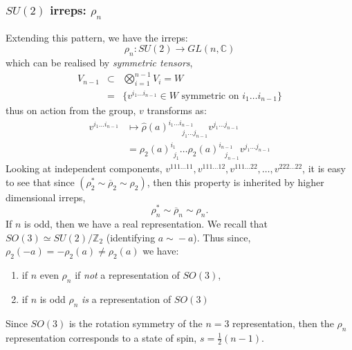 \begin{enumerate}
\subsubsection{$SU(2)$ irreps: $\rho_n$ }
Extending this pattern, we have the irreps: 
\begin{equation}
    \rho_n: SU(2)\rightarrow GL(n, \mathbb{C})
\end{equation}
which can be realised by \textit{symmetric tensors}, 
\begin{eqnarray}
    V_{n-1}&\subset& \bigotimes^{n-1}_{i=1} V_i = W\\
    &=&\{v^{i_1\dots i_{n-1}}\in W \text{ symmetric on }i_1\dots i_{n-1}\}
\end{eqnarray}
thus on action from the group, $v$ transforms as:
\begin{equation}
\begin{split}
    v^{i_1\dots i_{n-1}}&\mapsto \hat{\rho}(a)^{i_1\dots i_{n-1}}_{\ \ \ \ \ \ \ \ \ j_1\dots j_{n-1}}v^{j_1\dots j_{n-1}}\\
    &=\rho_2(a)^{i_1}_{\ \ j_1}\dots\rho_2(a)^{i_{n-1}}_{\ \ \ \ j_{n-1}}v^{j_1\dots j_{n-1}}
\end{split}
\end{equation}
Looking at independent components, $v^{111\dots 11}, v^{111\dots 12}, v^{111\dots 22}, \dots, v^{222\dots 22}$, it is easy to see that since $(\rho_2^*\sim{}\overline{\rho}_2\sim{}\rho_2)$, then this property is inherited by higher dimensional irreps, 
\begin{equation}
    \rho_n^*\sim{}\overline{\rho}_n\sim{}\rho_n.
\end{equation}
If $n$ is odd, then we have a real representation. We recall that $SO(3)\simeq{}SU(2)/\mathbb{Z}_2$ (identifying $a\sim{}-a$). Thus since, $\rho_2(-a) = -\rho_2(a)\neq \rho_2(a)$ we have: 
\begin{enumerate}
    \item if $n$ even $\rho_n$ if \textit{not} a representation of $SO(3)$,
    \item if $n$ is odd $\rho_n$ \textit{is} a representation of $SO(3)$
\end{enumerate}
Since $SO(3)$ is the rotation symmetry of the $n=3$ representation, then the $\rho_n$ representation corresponds to a state of spin, $s=\frac{1}{2}(n-1)$.


\end{enumerate}
